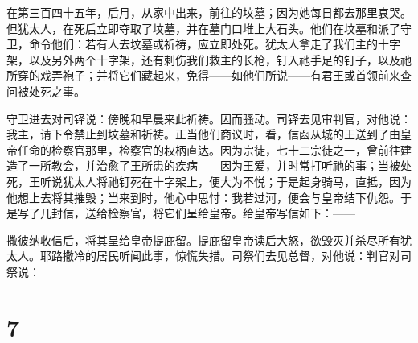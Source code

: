 在第三百四十五年，后月，从家中出来，前往的坟墓；因为她每日都去那里哀哭。但犹太人，在死后立即夺取了坟墓，并在墓门口堆上大石头。他们在坟墓和派了守卫，命令他们：若有人去坟墓或祈祷，应立即处死。犹太人拿走了我们主的十字架，以及另外两个十字架，还有刺伤我们救主的长枪，钉入祂手足的钉子，以及祂所穿的戏弄袍子；并将它们藏起来，免得——如他们所说——有君王或首领前来查问被处死之事。\par

守卫进去对司铎说：傍晚和早晨来此祈祷。因而骚动。司铎去见审判官，对他说：我主，请下令禁止到坟墓和祈祷。正当他们商议时，看，信函从城的王送到了由皇帝任命的检察官那里，检察官的权柄直达。因为宗徒，七十二宗徒之一，曾前往建造了一所教会，并治愈了王所患的疾病——因为王爱，并时常打听祂的事；当被处死，王听说犹太人将祂钉死在十字架上，便大为不悦；于是起身骑马，直抵，因为他想上去将其摧毁；当来到时，他心中思忖：我若过河，便会与皇帝结下仇怨。于是写了几封信，送给检察官，将它们呈给皇帝。给皇帝写信如下：——\par

\par

撒彼纳收信后，将其呈给皇帝提庇留。提庇留皇帝读后大怒，欲毁灭并杀尽所有犹太人。耶路撒冷的居民听闻此事，惊慌失措。司祭们去见总督，对他说：判官对司祭说：\par


\section{7}

